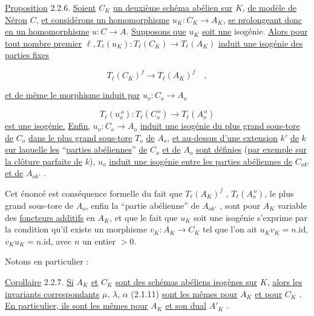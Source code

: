 \underline{Proposition} 2.2.6. \underline{Soient} $C_{K}$ \underline{un deuxième schéma abélien sur} $K$, \underline{de modèle de Néron} $C$, \underline{et considérons un homomorphisme} $u_{K}:C_{K} \longrightarrow A_{K}$, \underline{se prolongeant donc en un homomorphisme} $u: C \longrightarrow A$. \underline{Supposons que} $u_{K}$ \underline{soit une} isogénie. \underline{Alors pour tout nombre premier} $\ell,T_{\ell}(u_{K}):T_{\ell}(C_{K}) \longrightarrow T_{\ell}(A_{K})$ \underline{induit une isogénie des parties fixes}

\begin{equation}\tag{2.2.6.1}
T_{\ell}(C_{K})^{f} \longrightarrow T_{\ell}(A_{K})^{f} \quad ,
\end{equation}



\underline{et de même le morphisme induit par} $u_{o} : C_{o} \longrightarrow A_{o}$

\begin{equation}\tag{2.2.6.2}
T_{\ell}(u_{o}^{\,o}) : T_{\ell}(C_{o}^{\,o}) \longrightarrow T_{\ell}(A_{o}^{\,o})
\end{equation}
\underline{est une isogénie.} \underline{Enfin,} $u_{o} : C_{o} \longrightarrow A_{o}$ \underline{induit une isogénie du plus grand sous-tore de} $C_{o}$ \underline{dans le plus grand sous-tore} $T_{o}$ \underline{de} $A_{o}$, \underline{et au-dessus d'une extension} $k'$ \underline{de} $k$ \underline{sur laquelle les} ``\underline{parties abéliennes}'' \underline{de} $C_{o}$ \underline{et de} $A_{o}$ \underline{sont définies} (\underline{par exemple sur la clôture parfaite de} $k$), $u_{o}$ \underline{induit une isogénie entre les parties abéliennes de} $C_{ok'}$ \underline{et de} $A_{ok'}$ .

Cet énoncé est conséquence formelle du fait que $T_{\ell}(A_{K})^{f}$ , $T_{\ell}(A_{o}^{\,o})$, le plus grand sous-tore de $A_{o}$, enfin la ``partie abélienne'' de $A_{ok'}$ , sont pour $A_{K}$ variable des \underline{foncteurs additifs} en $A_{K}$, et que le fait que $u_{K}$ soit une isogénie s'exprime par la condition qu'il existe un morphisme $v_{K}:A_{K} \longrightarrow C_{K}$ tel que l'on ait $u_{K}v_{K} = n.\mathrm{id}$, $v_{K}u_{K} = n.\mathrm{id}$, avec $n$ un entier $> 0$.

Notons en particulier :

\underline{Corollaire} 2.2.7. \underline{Si} $A_{K}$ \underline{et} $C_{K}$ \underline{sont des schémas abéliens isogènes sur} $K$, \underline{alors les invariants correspondants} $\mu$, $\lambda$, $\alpha$ (2.1.11) \underline{sont les mêmes pour} $A_{K}$ \underline{et pour} $C_{K}$ . \underline{En particulier, ils sont les mêmes pour} $A_{K}$ \underline{et son dual} $A'_{K}$ .

